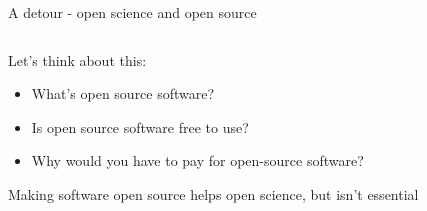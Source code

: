 \begin{frame}{A detour - open science and open source}
\begin{columns}[c]
    \begin{column}{0.45\textwidth}

    Let's think about this:
    \begin{itemize}
        \item What's open source software?
        \item Is open source software free to use?
        \item Why would you have to pay for open-source software?
    \end{itemize}
    
    Making software open source helps open science, but isn't essential
    
    \end{column}
\end{columns}

\end{frame}


